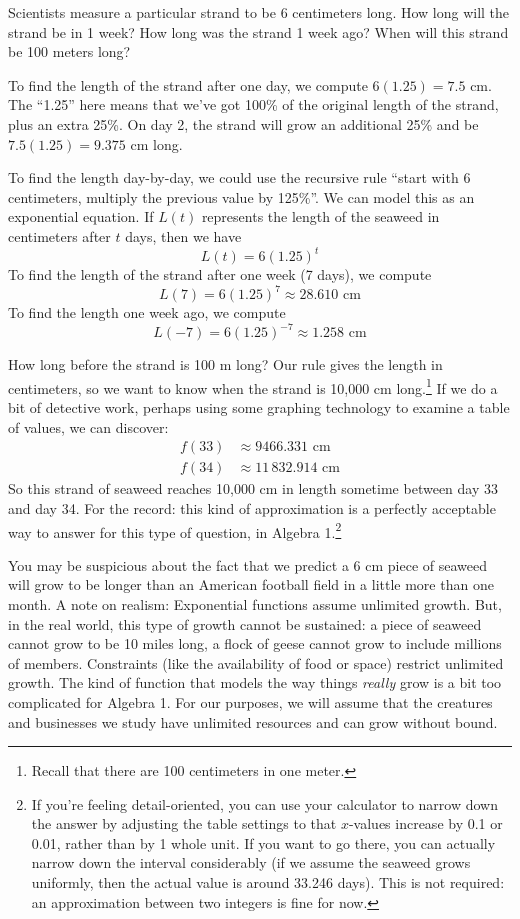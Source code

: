 Scientists measure a particular strand to be 6 centimeters long. How long will the strand be in 1 week? How long was the strand 1 week ago? When will this strand be 100 meters long?

To find the length of the strand after one day, we compute $6(1.25) = 7.5$ cm. The ``1.25'' here means that we've got 100\% of the original length of the strand, plus an extra 25\%. On day 2, the strand will grow an additional 25\% and be $7.5(1.25) = 9.375$ cm long.

To find the length day-by-day, we could use the recursive rule ``start with 6 centimeters, multiply the previous value by 125\%''. We can model this as an exponential equation. If $L(t)$ represents the length of the seaweed in centimeters after $t$ days, then we have \[L(t) = 6(1.25)^t\]
To find the length of the strand after one week (7 days), we compute \[L(7) = 6(1.25)^7 \approx 28.610 \text{ cm}\]
To find the length one week ago, we compute \[L(-7) = 6(1.25)^{-7} \approx 1.258 \text{ cm}\]

How long before the strand is 100 m long? Our rule gives the length in centimeters, so we want to know when the strand is 10,000 cm long.\footnote{Recall that there are 100 centimeters in one meter.} If we do a bit of detective work, perhaps using some graphing technology to examine a table of values, we can discover:
\[\begin{aligned}
f(33) &\approx 9466.331 \text{ cm}
\\
f(34) &\approx 11\,832.914 \text{ cm}
\end{aligned}\]
So this strand of seaweed reaches 10,000 cm in length sometime between day 33 and day 34. For the record: this kind of approximation is a perfectly acceptable way to answer for this type of question, in Algebra 1.\footnote{If you're feeling detail-oriented, you can use your calculator to narrow down the answer by adjusting the table settings to that $x$-values increase by 0.1 or 0.01, rather than by 1 whole unit. If you want to go there, you can actually narrow down the interval considerably (if we assume the seaweed grows uniformly, then the actual value is around 33.246 days). This is not required: an approximation between two integers is fine for now.}

You may be suspicious about the fact that we predict a 6 cm piece of seaweed will grow to be longer than an American football field in a little more than one month. A note on realism: Exponential functions assume unlimited growth. But, in the real world, this type of growth cannot be sustained: a piece of seaweed cannot grow to be 10 miles long, a flock of geese cannot grow to include millions of members. Constraints (like the availability of food or space) restrict unlimited growth. The kind of function that models the way things \textit{really} grow is a bit too complicated for Algebra 1. For our purposes, we will assume that the creatures and businesses we study have unlimited resources and can grow without bound.


